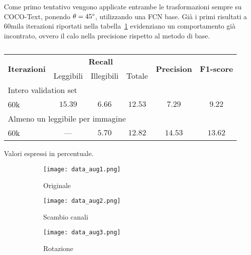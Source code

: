 Come primo tentativo vengono applicate entrambe le trasformazioni sempre su COCO-Text, ponendo $\theta = 45\text{\textdegree}$, utilizzando una FCN base. Già i primi risultati a 60mila iterazioni riportati nella tabella~\ref{tab:cocoaug} evidenziano un comportamento già incontrato, ovvero il calo nella precisione rispetto al metodo di base.

\begin{table}[H]
\centering
\begin{threeparttable}
	\begin{tabular}{l*{5}c}
		\toprule
		\multirow{2}{*}{\textbf{Iterazioni}} & \multicolumn{3}{c}{\textbf{Recall}} & \multirow{2}{*}{\textbf{Precision}} & \multirow{2}{*}{\textbf{F1-score}} \\
		\cmidrule(lr){2-4}
		& Leggibili & Illegibili & Totale &  &  \\
		\midrule
		\multicolumn{6}{l}{Intero validation set} \\
		60k		& $15.39$ & $6.66$  & $12.53$ & $7.29$ & $9.22$ \\
		\midrule
		\multicolumn{6}{l}{Almeno un leggibile per immagine} \\
		60k		&   ---   & $5.70$ & $12.82$ & $14.53$ & $13.62$ \\
		\bottomrule
	\end{tabular}
	\begin{tablenotes}
		\item \footnotesize{Valori espressi in percentuale.}
	\end{tablenotes}
\end{threeparttable}
\caption{}\label{tab:cocoaug}
\end{table}

\begin{figure}[H]
	\centering
	\begin{subfigure}[b]{0.23\textwidth}
		\texttt{[image: data\_aug1.png]}
		\caption{Originale}
	\end{subfigure}
	\hfill
	\begin{subfigure}[b]{0.23\textwidth}
		\texttt{[image: data\_aug2.png]}
		\caption{Scambio canali}
	\end{subfigure}
	\hfill
	\begin{subfigure}[b]{0.23\textwidth}
		\texttt{[image: data\_aug3.png]}
		\caption{Rotazione}
	\end{subfigure}
\caption{}
\label{fig:data_aug}
\end{figure}



